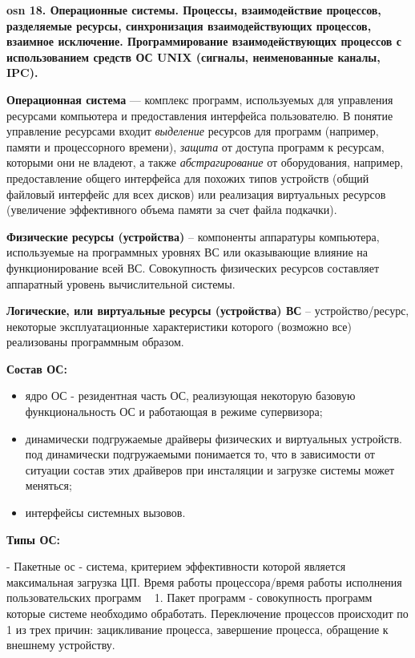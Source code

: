 \textbf{\LARGE osn 18. Операционные системы. Процессы, взаимодействие процессов, разделяемые ресурсы, синхронизация взаимодействующих процессов, взаимное исключение. Программирование взаимодействующих процессов с использованием средств ОС UNIX (сигналы, неименованные каналы, IPC).}

\textbf{Операционная система} --- комплекс программ, используемых для управления ресурсами компьютера и предоставления интерфейса пользователю.
В понятие управление ресурсами входит \textit{выделение} ресурсов для программ (например, памяти и процессорного времени),
\textit{защита} от доступа программ к ресурсам, которыми они не владеют, а также
\textit{абстрагирование} от оборудования, например, предоставление общего интерфейса для похожих типов устройств
(общий файловый интерфейс для всех дисков) или реализация виртуальных ресурсов (увеличение эффективного объема памяти за счет файла подкачки).

\textbf{Физические ресурсы (устройства)} -- компоненты аппаратуры компьютера, используемые на программных уровнях ВС или оказывающие влияние на функционирование всей ВС. Совокупность физических ресурсов составляет аппаратный уровень вычислительной системы.

\textbf{Логические, или виртуальные ресурсы (устройства) ВС} -- устройство/ресурс, некоторые эксплуатационные характеристики которого (возможно все) реализованы программным образом.

\textbf{Состав ОС:} 
\begin{itemize}
    \item ядро ОС - резидентная часть ОС, реализующая некоторую базовую функциональность ОС и работающая в режиме супервизора;
    \item динамически подгружаемые драйверы физических и виртуальных устройств. под динамически подгружаемыми понимается то, что в зависимости от ситуации состав этих драйверов при инсталяции и загрузке системы может меняться;
    \item интерфейсы системных вызовов.
\end{itemize} 

\textbf{Типы ОС:} 

- Пакетные ос  - система, критерием эффективности которой является максимальная загрузка ЦП. Время работы процессора/время работы исполнения пользовательских программ ~ 1. Пакет программ - совокупность программ которые системе необходимо обработать. Переключение процессов происходит по 1 из трех причин: зацикливание процесса, завершение процесса, обращение к внешнему устройству. 

